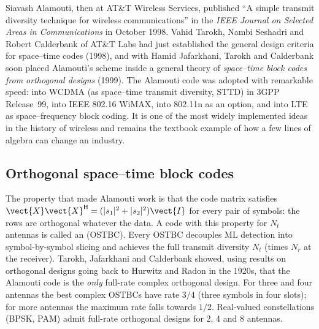 \begin{history}
Siavash Alamouti, then at AT\&T Wireless Services, published ``A simple transmit diversity
technique for wireless communications'' in the \emph{IEEE Journal on Selected Areas in
Communications} in October 1998. Vahid Tarokh, Nambi Seshadri and Robert Calderbank of AT\&T Labs
had just established the general design criteria for space--time codes (1998), and with Hamid
Jafarkhani, Tarokh and Calderbank soon placed Alamouti's scheme inside a general theory of
\emph{space--time block codes from orthogonal designs} (1999). The Alamouti code was adopted with
remarkable speed: into WCDMA (as space--time transmit diversity, STTD) in 3GPP Release~99, into
IEEE 802.16 WiMAX, into 802.11n as an option, and into LTE as space--frequency block coding. It is
one of the most widely implemented ideas in the history of wireless and remains the textbook
example of how a few lines of algebra can change an industry.
\end{history}

\subsection{Orthogonal space--time block codes}

The property that made Alamouti work is that the code matrix satisfies
$\vect{X}\vect{X}^{\mathsf H}=(|s_1|^2+|s_2|^2)\vect{I}$ for every pair of symbols: the rows are
orthogonal whatever the data. A code with this property for $N_t$ antennas is called an
 (OSTBC). Every OSTBC decouples ML detection into
symbol-by-symbol slicing and achieves the full transmit diversity $N_t$ (times $N_r$ at the
receiver). Tarokh, Jafarkhani and Calderbank showed, using results on orthogonal designs going back
to Hurwitz and Radon in the 1920s, that the Alamouti code is the \emph{only} full-rate complex
orthogonal design. For three and four antennas the best complex OSTBCs have rate $3/4$ (three
symbols in four slots); for more antennas the maximum rate falls towards $1/2$. Real-valued
constellations (BPSK, PAM) admit full-rate orthogonal designs for 2, 4 and 8 antennas.


